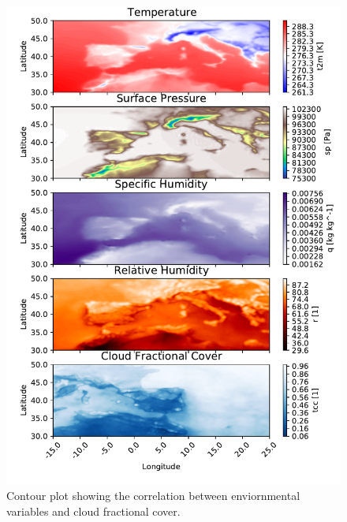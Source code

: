 \begin{figure}[ht]
    \centering
    \includegraphics{python_figs/contour_temporally_averaged.pdf}
    \caption{Contour plot showing the correlation between enviornmental variables and cloud fractional cover. }
    \label{fig:correlation_tcc_vs_envio}
\end{figure}

